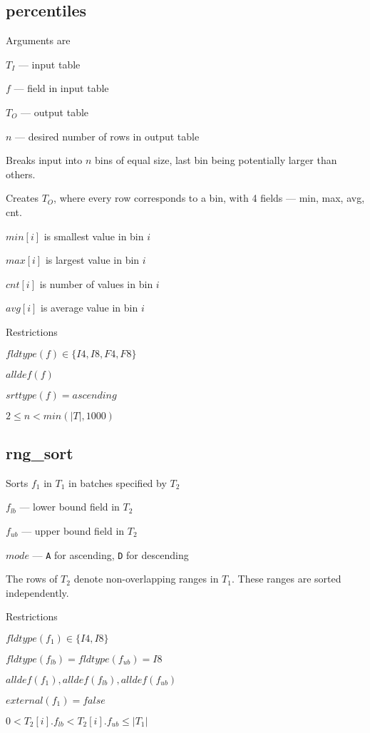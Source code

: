 \subsection{percentiles}
\label{percentiles}
Arguments are
\be
\item \(T_I\) --- input table
\item \(f\)   --- field in input table
\item \(T_O\) --- output table 
\item \(n\) --- desired number of rows in output table
\ee
\bi
\item Breaks input into \(n\) bins of equal size, last bin being potentially
larger than others. 
\item Creates \(T_O\), where every row corresponds to a bin, 
with 4 fields --- min, max, avg, cnt.
\be
\item \(min[i]\) is smallest value in bin \(i\)
\item \(max[i]\) is largest value in bin \(i\)
\item \(cnt[i]\) is number of values in bin \(i\)
\item \(avg[i]\) is average value in bin \(i\)
\ee
\ei


Restrictions
\be
\item \(fldtype(f) \in \{I4, I8, F4, F8\}\)
\item \(alldef(f)\)
\item \(srttype(f) = ascending\)
\item \(2 \leq n < min(|T|, 1000)\)
\ee

\subsection{rng\_sort}
\label{rng_sort}

Sorts \(f_1\) in \(T_1\) in batches specified by \(T_2\)
\be
\item \(f_{lb}\) --- lower bound field in \(T_2\) 
\item \(f_{ub}\) --- upper bound field in \(T_2\) 
\item \(mode\) --- {\tt A} for ascending, {\tt D} for descending
\ee

The rows of \(T_2\) denote non-overlapping ranges in \(T_1\). These
ranges are sorted independently.

Restrictions
\be
\item \(fldtype(f_1) \in \{I4, I8\}\)
\item \(fldtype(f_{lb})  = fldtype(f_{ub}) = I8\)
\item \(alldef(f_1), alldef(f_{lb}), alldef(f_{ub})\) 
\item \(external(f_1) = false\)
\item \(0 < T_2[i].f_{lb} < T_2[i].f_{ub} \leq |T_1|\)
\ee

